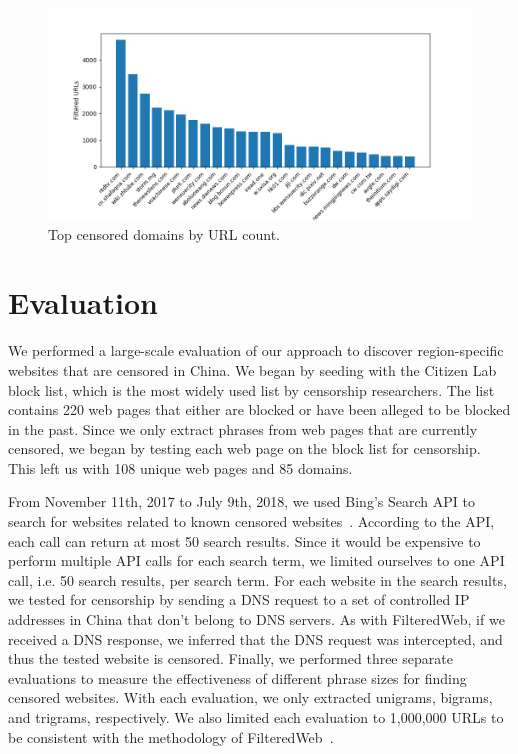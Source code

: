 \begin{figure}[t]
  \centering
  \includegraphics[scale=0.6]{figures/top-domains}
  \caption{\label{top-domains}Top censored domains by URL count.}
\end{figure}

\section{Evaluation}

We performed a large-scale evaluation of our approach to
discover region-specific websites that are censored in China.  We
began by seeding with the Citizen Lab block list, which is
the most widely used list by censorship researchers. The list contains
220 web pages that either are blocked or have been alleged to be blocked in
the past. Since we only extract phrases from web pages that are
currently censored, we began by testing each web page on the block list for
censorship. This left us with 108 unique web pages and 85 domains.

From November 11th, 2017 to July 9th, 2018, we used Bing's Search API
to search for websites related to known censored
websites~\cite{microsoft:bing}. According to the API, each call can
return at most 50 search results. Since it would be expensive to
perform multiple API calls for each search term, we limited ourselves
to one API call, i.e. 50 search results, per search term. For each
website in the search results, we tested for censorship by sending a
DNS request to a set of controlled IP addresses in China that don't
belong to DNS servers. As with FilteredWeb, if we received a DNS
response, we inferred that the DNS request was intercepted, and thus
the tested website is censored. Finally, we performed three separate
evaluations to measure the effectiveness of different phrase sizes for
finding censored websites. With each evaluation, we only extracted
unigrams, bigrams, and trigrams, respectively. We also limited each
evaluation to 1,000,000 URLs to be consistent with the methodology of
FilteredWeb~\cite{darer2017filteredweb}.

